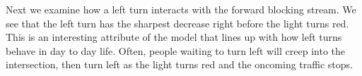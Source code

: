 \documentclass[12pt]{article}
\begin{document}
Next we examine how a left turn interacts with the forward blocking stream. We see that the left turn has the sharpest decrease right before the light turns red. This is an interesting attribute of the model that lines up with how left turns behave in day to day life. Often, people waiting to turn left will creep into the intersection, then turn left as the light turns red and the oncoming traffic stops.\\



\end{document}
